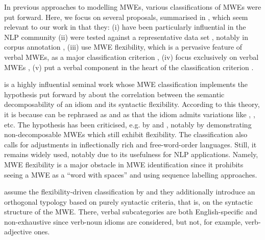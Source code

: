 \documentclass[output=paper,
modfonts,
]{langscibook}
\begin{document}
In previous approaches to modelling MWEs, various classifications of MWEs were put forward. 
Here, we focus on several proposals, summarised in , which seem relevant to our work in that they: 
(i) have been particularly influential in the NLP community \citep{Sag2002a,baldwin2010multiword,Melcuk10}
(ii) were tested against a representative data set \citep{Melcuk10}, notably in corpus annotation \citep{schneider2014}, %
(iii) use MWE flexibility, which is a pervasive feature of verbal MWEs, as a major classification criterion \citep{Sag2002a}, 
(iv) focus exclusively on verbal MWEs \citep{Sheinfux17}, 
(v) put a verbal component in the heart of the classification criterion \citep{Laporte:forth}.


\citet{Sag2002a} is a highly influential seminal work whose MWE classification implements the hypothesis put forward by \citet{nunberg-94} about the correlation between the semantic decomposability of an idiom and its syntactic flexibility. According to this theory, it is because  can be rephrased as  and  as  that the idiom  admits variations like , , etc. The hypothesis has been criticised, e.g. by \citet{Sheinfux17} and \citet{Laporte:forth}, notably by demonstrating non-decomposable MWEs which still exhibit flexibility. The \citet{Sag2002a} classification also calls for adjustments in inflectionally rich and free-word-order languages. Still, it remains widely used, notably due to its usefulness for NLP applications. Namely, MWE flexibility is a major obstacle in MWE identification since it prohibits seeing a MWE as a ``word with spaces'' and using sequence labelling approaches.

\citet{baldwin2010multiword} assume the flexibility-driven classification by \citet{Sag2002a} and they additionally introduce an orthogonal typology based on purely syntactic criteria, that is, on the syntactic structure of the MWE. There, verbal subcategories are both English-specific and non-exhaustive since verb-noun idioms are considered, but not, for example, verb-adjective ones.
\end{document}

